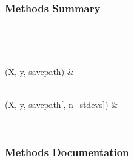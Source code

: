 \documentclass[letterpaper,10pt,english]{sphinxmanual}
\begin{document}
\begin{fulllineitems}
\begin{description}
\begin{description}
\begin{description}
\end{description}

\end{description}

\end{description}
\subsubsection*{Methods Summary}


\begin{savenotes}\sphinxatlongtablestart\begin{longtable}[c]{}
\hline

\endfirsthead

%
{}\\
\hline

\endhead

\hline
{}\\
\endfoot

\endlastfoot

{\hyperref[\detokenize{api/mastml.data_cleaning.DataUtilities:mastml.data_cleaning.DataUtilities.flag_columns_with_strings}]{}}(X, y, savepath)
&

\\
\hline
{\hyperref[\detokenize{api/mastml.data_cleaning.DataUtilities:mastml.data_cleaning.DataUtilities.flag_outliers}]{}}(X, y, savepath{[}, n\_stdevs{]})
&

\\
\hline
\end{longtable}\sphinxatlongtableend\end{savenotes}
\subsubsection*{Methods Documentation}

\begin{fulllineitems}
\label{\detokenize{api/mastml.data_cleaning.DataUtilities:mastml.data_cleaning.DataUtilities.flag_columns_with_strings}}
\end{fulllineitems}


\end{fulllineitems}
\end{document}
